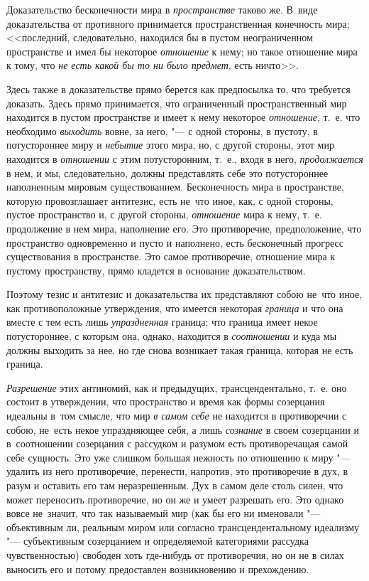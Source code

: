 Доказательство бесконечности мира в {\em пространстве} таково же. В~виде
доказательства от противного принимается пространственная конечность мира;
<<последний, следовательно, находился бы в пустом неограниченном пространстве
и имел бы некоторое {\em отношение} к нему; но такое отношение мира к тому, что
{\em не есть какой бы то ни было предмет}, есть ничто>>.

Здесь также в доказательстве прямо берется как предпосылка то, что требуется
доказать. Здесь прямо принимается, что ограниченный пространственный мир
находится в пустом пространстве и имеет к нему некоторое {\em отношение}, т.~е.
что необходимо {\em выходить} вовне, за него, "--- с одной стороны, в пустоту,
в потустороннее миру и {\em небытие} этого мира, но, с другой стороны, этот мир
находится в {\em отношении} с этим потусторонним, т.~е., входя в него,
{\em продолжается} в нем, и мы, следовательно, должны представлять себе это
потустороннее наполненным мировым существованием. Бесконечность мира в
пространстве, которую провозглашает антитезис, есть не~что иное, как, с одной
стороны, пустое пространство и, с другой стороны, {\em отношение} мира к нему,
т.~е. продолжение в нем мира, наполнение его. Это противоречие, предположение,
что пространство одновременно и пусто и наполнено, есть бесконечный прогресс
существования в пространстве. Это самое противоречие, отношение мира к пустому
пространству, прямо кладется в основание доказательством.

Поэтому тезис и антитезис и доказательства их представляют собою не~что иное,
как противоположные утверждения, что имеется некоторая {\em граница} и что она
вместе с тем есть лишь {\em упраздненная} граница; что граница имеет некое
потустороннее, с которым она, однако, находится в {\em соотношении} и куда мы
должны выходить за нее, но где снова возникает такая граница, которая не есть
граница.

{\em Разрешение} этих антиномий, как и предыдущих, трансцендентально, т.~е. оно
состоит в утверждении, что пространство и время как формы созерцания идеальны
в~том смысле, что мир {\em в самом себе} не находится в противоречии с собою,
не~есть некое упраздняющее себя, а лишь {\em сознание} в своем созерцании и
в~соотношении созерцания с рассудком и разумом есть противоречащая самой себе
сущность. Это уже слишком большая нежность по отношению к миру "--- удалить из
него противоречие, перенести, напротив, это противоречие в дух, в разум и
оставить его там неразрешенным. Дух в самом деле столь силен, что может
переносить противоречие, но он же и умеет разрешать его. Это однако вовсе
не~значит, что так называемый мир (как бы его ни именовали "--- объективным ли,
реальным миром или согласно трансцендентальному идеализму "--- субъективным
созерцанием и определяемой категориями рассудка чувственностью) свободен хоть
где-нибудь от противоречия, но он не в силах выносить его и потому предоставлен
возникновению и прехождению.

